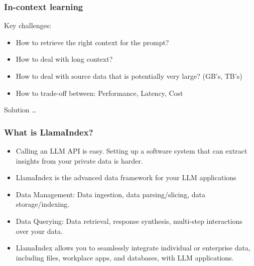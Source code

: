 \begin{frame}[fragile]\frametitle{In-context learning}

Key challenges:

\begin{itemize}
\item How to retrieve the right context for the prompt?
\item How to deal with long context? 
\item How to deal with source data that is potentially very large? (GB’s, TB’s) 
\item How to trade-off between: Performance, Latency, Cost
\end{itemize}	

Solution \ldots

\end{frame}

\begin{frame}[fragile]\frametitle{What is LlamaIndex?}

\begin{itemize}
\item Calling an LLM API is easy. Setting up a software system that can extract insights from your private data is harder.
\item LlamaIndex is the advanced data framework for your LLM applications
\item Data Management: Data ingestion, data parsing/slicing, data storage/indexing.
\item Data Querying: Data retrieval, response synthesis, multi-step interactions over your data.
\item LlamaIndex allows you to seamlessly integrate individual or enterprise data, including files, workplace apps, and databases, with LLM applications. 
\end{itemize}	


\end{frame}

